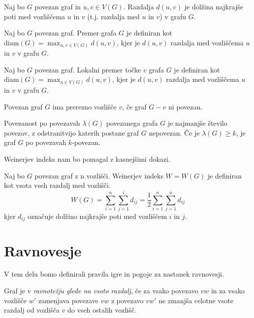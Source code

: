 \documentclass[fin1, tisk]{fmfdelo}
\begin{document}
\begin{definicija}
Naj bo $G$ povezan graf in $u, v \in V(G)$. Razdalja $d(u, v)$ je dolžina najkrajše poti med vozliščema $u$ in $v$ (t.j. razdalja med $u$ in $v$) v grafu $G$.
\end{definicija}

\begin{definicija}
Naj bo $G$ povezan graf. Premer grafa $G$ je definiran kot $\text{diam}(G) = \max_{u, v \in V(G)} d(u, v)$, kjer je $d(u, v)$ razdalja med vozliščema $u$ in $v$ v grafu $G$.
\end{definicija}

\begin{definicija}
Naj bo $G$ povezan graf. Lokalni premer točke $v$ grafa $G$ je definiran kot $\text{diam}(G) = \max_{u \in V(G)} d(u, v)$, kjer je $d(u, v)$ razdalja med vozliščema $u$ in $v$ v grafu $G$.
\end{definicija}

\begin{definicija}
Povezan graf $G$ ima prerezno vozlišče $v$, če graf $G - v$ ni povezan.
\end{definicija}

\begin{definicija}
Povezanost po povezavah $\lambda(G)$ povezanega grafa $G$ je najmanjše število povezav,
z odstranitvijo katerih postane graf $G$ nepovezan. Če je $\lambda(G) \geq k$,
je graf $G$ po povezavah $k$-povezan.
\end{definicija}

Weinerjev indeks nam bo pomagal z kasnejšimi dokazi.

\begin{definicija}
Naj bo $G$ povezan graf z n vozlišči. Weinerjev indeks $W = W(G)$ je definiran
kot vsota vseh razdalj med vozlišči.
$$W(G) = \sum_{i=1}^{n} \sum_{j=1}^{i} d_{ij} = \frac{1}{2} \sum_{i=1}^{n} \sum_{j=1}^{n} d_{ij}$$
kjer $d_{ij}$ označuje dolžino najkrajše poti med vozliščem $i$ in $j$.
\end{definicija}


\section{Ravnovesje}
V tem delu bomo definirali pravila igre in pogoje za nastanek ravnovesji.

\begin{definicija}
Graf je v \textit{ravnotežju glede na vsoto razdalj}, če za vsako povezavo $vw$ in
za vsako vozlišče $w'$ zamenjava povezave $vw$ z povezavo $vw'$ ne zmanjša
celotne vsote razdalj od vozlišča $v$ do vseh ostalih vozlišč.
\end{definicija}
\end{document}
